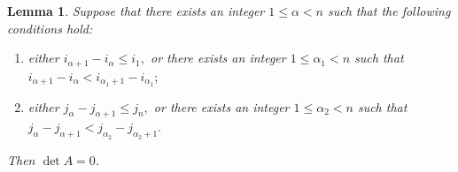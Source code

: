 \documentclass[11pt,reqno]{amsart}
\theoremstyle{plain}
\newtheorem{lem}[thm]{Lemma}
\theoremstyle{remark}
\theoremstyle{definition}
\begin{document}
\begin{lem}\label{n4}
Suppose that there exists an integer $1\leq \alpha<n$ such that the following conditions hold:
\begin{enumerate}
\item either
\(i_{\alpha+1}-i_{\alpha}\leq i_1,\)
or there exists an integer $1\leq \alpha_1<n$ such that
\(i_{\alpha+1}-i_{\alpha}<i_{\alpha_1+1}-i_{\alpha_1};\)

\item either
\(j_{\alpha}-j_{\alpha+1}\leq j_n,\)
or there exists an integer $1\leq \alpha_2<n$ such that
\(j_{\alpha}-j_{\alpha+1}<j_{\alpha_2}-j_{\alpha_2+1}.\)
\end{enumerate}

Then $\det A=0$.
\end{lem}
\end{document}
